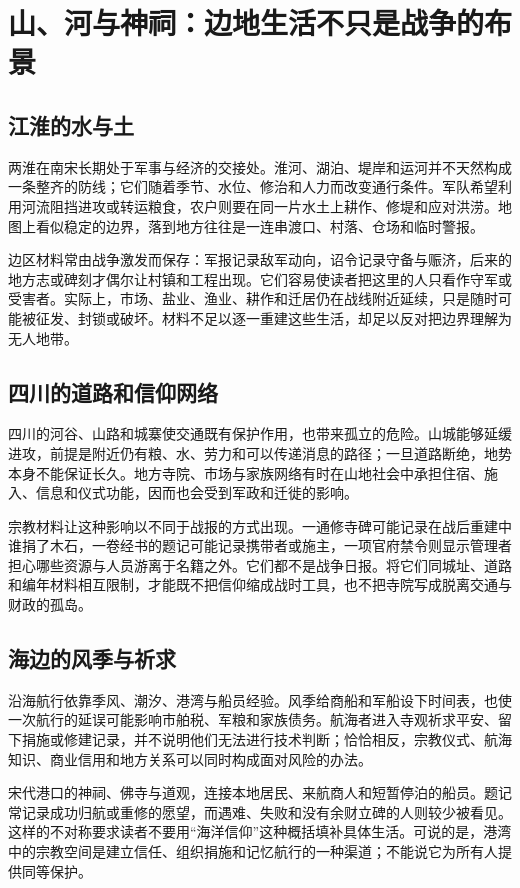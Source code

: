\section{山、河与神祠：边地生活不只是战争的布景}

\subsection{江淮的水与土}

两淮在南宋长期处于军事与经济的交接处。淮河、湖泊、堤岸和运河并不天然构成一条整齐的防线；它们随着季节、水位、修治和人力而改变通行条件。军队希望利用河流阻挡进攻或转运粮食，农户则要在同一片水土上耕作、修堤和应对洪涝。地图上看似稳定的边界，落到地方往往是一连串渡口、村落、仓场和临时警报。

边区材料常由战争激发而保存：军报记录敌军动向，诏令记录守备与赈济，后来的地方志或碑刻才偶尔让村镇和工程出现。它们容易使读者把这里的人只看作守军或受害者。实际上，市场、盐业、渔业、耕作和迁居仍在战线附近延续，只是随时可能被征发、封锁或破坏。材料不足以逐一重建这些生活，却足以反对把边界理解为无人地带。

\subsection{四川的道路和信仰网络}

四川的河谷、山路和城寨使交通既有保护作用，也带来孤立的危险。山城能够延缓进攻，前提是附近仍有粮、水、劳力和可以传递消息的路径；一旦道路断绝，地势本身不能保证长久。地方寺院、市场与家族网络有时在山地社会中承担住宿、施入、信息和仪式功能，因而也会受到军政和迁徙的影响。

宗教材料让这种影响以不同于战报的方式出现。一通修寺碑可能记录在战后重建中谁捐了木石，一卷经书的题记可能记录携带者或施主，一项官府禁令则显示管理者担心哪些资源与人员游离于名籍之外。它们都不是战争日报。将它们同城址、道路和编年材料相互限制，才能既不把信仰缩成战时工具，也不把寺院写成脱离交通与财政的孤岛。

\subsection{海边的风季与祈求}

沿海航行依靠季风、潮汐、港湾与船员经验。风季给商船和军船设下时间表，也使一次航行的延误可能影响市舶税、军粮和家族债务。航海者进入寺观祈求平安、留下捐施或修建记录，并不说明他们无法进行技术判断；恰恰相反，宗教仪式、航海知识、商业信用和地方关系可以同时构成面对风险的办法。

宋代港口的神祠、佛寺与道观，连接本地居民、来航商人和短暂停泊的船员。题记常记录成功归航或重修的愿望，而遇难、失败和没有余财立碑的人则较少被看见。这样的不对称要求读者不要用“海洋信仰”这种概括填补具体生活。可说的是，港湾中的宗教空间是建立信任、组织捐施和记忆航行的一种渠道；不能说它为所有人提供同等保护。

